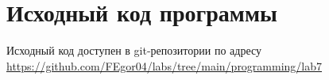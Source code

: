 \section{Исходный код программы}
Исходный код доступен в git-репозитории по адресу \url{https://github.com/FEgor04/labs/tree/main/programming/lab7}
